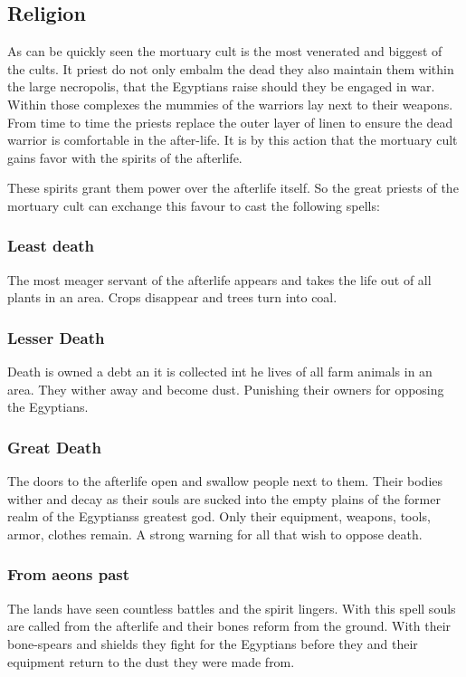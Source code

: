 \documentclass[a4paper]{book}
\begin{document}
	\subsection{Religion}
		As can be quickly seen the mortuary cult is the most venerated and biggest of the cults.
		It priest do not only embalm the dead they also maintain them within the large necropolis,
		that the \gls{Egyptians} raise should they be engaged in war.
		Within those complexes the mummies of the warriors lay next to their weapons.
		From time to time the priests replace the outer layer of linen to ensure the dead warrior
		is comfortable in the after-life.
		It is by this action that the mortuary cult gains favor with the spirits of the afterlife.

		These spirits grant them power over the afterlife itself.
		So the great priests of the mortuary cult can exchange this favour to cast the following spells:

		\subsubsection{Least death}
			The most meager servant of the afterlife appears and takes the life out of all plants
			in an area.
			Crops disappear and trees turn into coal.

		\subsubsection{Lesser Death}
			Death is owned a debt an it is collected int he lives of all farm animals
			in an area.
			They wither away and become dust.
			Punishing their owners for opposing the \gls{Egyptians}.

		\subsubsection{Great Death}
			The doors to the afterlife open and swallow people next to them.
			Their bodies wither and decay as their souls are sucked into the empty plains
			of the former realm of the \gls{Egyptians}s greatest god.
			Only their equipment, weapons, tools, armor, clothes remain.
			A strong warning for all that wish to oppose death.

		\subsubsection{From aeons past}
			The lands have seen countless battles and the spirit lingers.
			With this spell souls are called from the afterlife
			and their bones reform from the ground.
			With their bone-spears and shields they fight for the \gls{Egyptians}
			before they and their equipment return to the dust they were made from.
\end{document}
